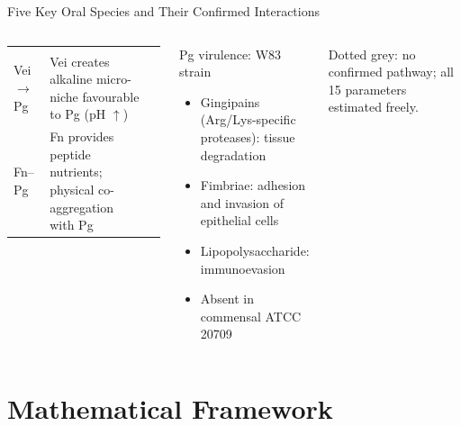 \documentclass[aspectratio=169,10pt,t]{beamer}
\begin{document}
\begin{frame}[t]{Five Key Oral Species and Their Confirmed Interactions}
\begin{columns}[T]
\begin{tabular}{@{}p{1.3cm}p{3.2cm}p{2.1cm}@{}}
          & \cite{Kolenbrander2010OralMultispecies}\\
        Vei$\to$Pg & Vei creates alkaline micro-niche favourable to Pg (pH $\uparrow$)
          & \cite{Heine2025PeriImplant}\\
        Fn--Pg & Fn provides peptide nutrients; physical co-aggregation with Pg
          & \cite{Kolenbrander2010OralMultispecies}\\
        \bottomrule
      \end{tabular}
      \vspace{5pt}
      \begin{block}{Pg virulence: W83 strain}
        \begin{itemize}\setlength{\itemsep}{1pt}
          \item Gingipains (Arg/Lys-specific proteases): tissue degradation
          \item Fimbriae: adhesion and invasion of epithelial cells
          \item Lipopolysaccharide: immunoevasion \cite{Mukherjee2025PgTitanium}
          \item Absent in commensal ATCC\,20709
        \end{itemize}
      \end{block}
      \vspace{4pt}
      {\scriptsize\color{midgray}
       Dotted grey: no confirmed pathway; all 15 parameters estimated freely.}
  \end{columns}
\end{frame}

\section{Mathematical Framework}
\end{document}

